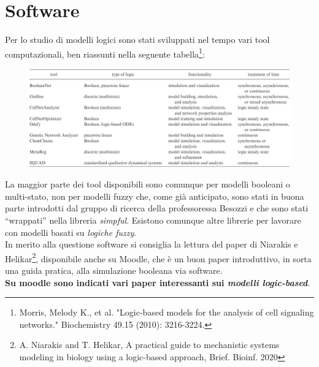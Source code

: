 \documentclass[a4paper,12pt, oneside]{book}
\begin{document}
\section{Software}
Per lo studio di modelli logici sono stati sviluppati nel tempo vari tool
computazionali, ben riassunti nella seguente tabella\footnote{Morris, Melody K.,
  et al. "Logic-based models for the analysis of cell signaling networks."
  Biochemistry 49.15 (2010): 3216-3224.}:
\begin{figure}[H]
  \centering
  \includegraphics[width = \textwidth]{img/logtool.jpg}
\end{figure}
La maggior parte dei tool disponibili sono comunque per modelli booleani o
multi-stato, non per modelli fuzzy che, come già anticipato, sono stati in buona
parte introdotti dal gruppo di ricerca della professoressa Besozzi e che sono
stati ``wrappati'' nella libreria \textit{simpful}. Esistono comunque altre
librerie per lavorare con modelli basati su \textit{logiche fuzzy}.\\
In merito alla questione software si consiglia la lettura del paper di Niarakis
e Helikar\footnote{A. Niarakis and T. Helikar, A practical guide to mechanistic
  systems modeling in biology using a logic-based approach,
  Brief. Bioinf. 2020}, disponibile anche su Moodle, che è un buon paper
introduttivo, in sorta una guida pratica, alla simulazione booleana via
software.\\ 
\textbf{Su moodle sono indicati vari paper interessanti sui \textit{modelli
    logic-based}}. 
\end{document}
